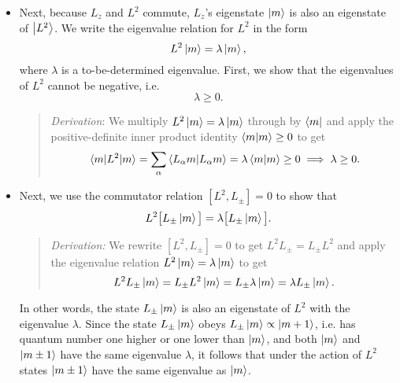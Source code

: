 \documentclass[11pt, a4paper]{article}
\begin{document}
\begin{itemize}
	\item Next, because $ L_{z} $ and $ L^{2} $ commute, $ L_{z} $'s eigenstate $ \ket{m} $ is also an eigenstate of $ \ket{L^{2}} $. We write the eigenvalue relation for $ L^{2} $ in the form
    \begin{equation*}
        L^{2} \ket{m} = \lambda \ket{m},
    \end{equation*}
    where $ \lambda $ is a to-be-determined eigenvalue. First, we show that the eigenvalues of $ L^{2} $ cannot be negative, i.e.
    \begin{equation*}
        \lambda \geq 0.
    \end{equation*}
    \begin{quote}
        \textit{Derivation}: We multiply $ L^{2} \ket{m} = \lambda \ket{m} $ through by $ \bra{m} $ and apply the positive-definite inner product identity $ \braket{m}{m} \geq 0 $ to get
        \begin{equation*}
            \mel{m}{L^{2}}{m} = \sum_{\alpha} \braket{L_{\alpha}m}{L_{\alpha}m} = \lambda \braket{m}{m} \geq 0 \implies \lambda \geq 0.
        \end{equation*}
    \end{quote}
    
	
    \item Next, we use the commutator relation $ [L^{2}, L_{\pm}] = 0 $ to show that
    \begin{equation*}
        L^{2} \big[ L_{\pm} \ket{m} \big] = \lambda \big[ L_{\pm}\ket{m} \big].
    \end{equation*}
    \begin{quote}
        \textit{Derivation:} We rewrite $ [L^{2}, L_{\pm}] = 0 $ to get $ L^{2} L_{\pm} = L_{\pm} L^{2}  $ and apply the eigenvalue relation $ L^{2}\ket{m} = \lambda \ket{m} $ to get
        \begin{equation*}
            L^{2} L_{\pm}\ket{m} = L_{\pm} L^{2} \ket{m} = L_{\pm}\lambda \ket{m} = \lambda L_{\pm} \ket{m}.
        \end{equation*}
    \end{quote}
	In other words, the state $ L_{\pm} \ket{m} $ is also an eigenstate of $ L^{2} $ with the eigenvalue $ \lambda $. Since the state $ L_{\pm} \ket{m} $ obeys $ L_{\pm} \ket{m} \propto \ket{m + 1} $, i.e. has quantum number one higher or one lower than $ \ket{m} $, and both $ \ket{m} $ and $ \ket{m \pm 1} $ have the same eigenvalue $ \lambda $, it follows that under the action of $ L^{2} $ states $ \ket{m \pm 1} $ have the same eigenvalue as $ \ket{m} $.
	

\end{itemize}
\end{document}
